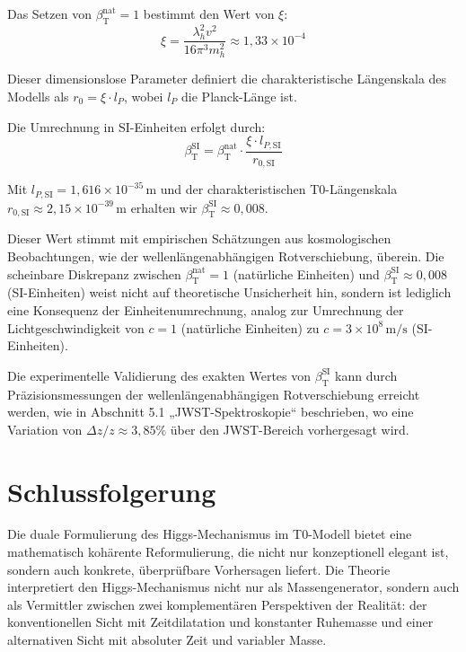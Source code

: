 \documentclass[a4paper,12pt]{article}
\newcommand{\betaT}{\beta_{\text{T}}}
\begin{document}
	Das Setzen von \(\betaT^{\text{nat}} = 1\) bestimmt den Wert von \(\xi\):
	\begin{equation}
		\xi = \frac{\lambda_h^2 v^2}{16\pi^3 m_h^2} \approx 1,33 \times 10^{-4}
	\end{equation}
	
	Dieser dimensionslose Parameter definiert die charakteristische Längenskala des Modells als \(r_0 = \xi \cdot l_P\), wobei \(l_P\) die Planck-Länge ist.
	
	Die Umrechnung in SI-Einheiten erfolgt durch:
	\begin{equation}
		\betaT^{\text{SI}} = \betaT^{\text{nat}} \cdot \frac{\xi \cdot l_{P,\text{SI}}}{r_{0,\text{SI}}}
	\end{equation}
	
	Mit \(l_{P,\text{SI}} = 1,616 \times 10^{-35} \, \text{m}\) und der charakteristischen T0-Längenskala \(r_{0,\text{SI}} \approx 2,15 \times 10^{-39} \, \text{m}\) erhalten wir \(\betaT^{\text{SI}} \approx 0,008\).
	
	Dieser Wert stimmt mit empirischen Schätzungen aus kosmologischen Beobachtungen, wie der wellenlängenabhängigen Rotverschiebung, überein. Die scheinbare Diskrepanz zwischen \(\betaT^{\text{nat}} = 1\) (natürliche Einheiten) und \(\betaT^{\text{SI}} \approx 0,008\) (SI-Einheiten) weist nicht auf theoretische Unsicherheit hin, sondern ist lediglich eine Konsequenz der Einheitenumrechnung, analog zur Umrechnung der Lichtgeschwindigkeit von \(c = 1\) (natürliche Einheiten) zu \(c = 3 \times 10^8 \, \text{m/s}\) (SI-Einheiten).
	
	Die experimentelle Validierung des exakten Wertes von \(\betaT^{\text{SI}}\) kann durch Präzisionsmessungen der wellenlängenabhängigen Rotverschiebung erreicht werden, wie in Abschnitt 5.1 „JWST-Spektroskopie“ beschrieben, wo eine Variation von \(\Delta z / z \approx 3,85\%\) über den JWST-Bereich vorhergesagt wird.
	
	\section{Schlussfolgerung}
	Die duale Formulierung des Higgs-Mechanismus im T0-Modell bietet eine mathematisch kohärente Reformulierung, die nicht nur konzeptionell elegant ist, sondern auch konkrete, überprüfbare Vorhersagen liefert. Die Theorie interpretiert den Higgs-Mechanismus nicht nur als Massengenerator, sondern auch als Vermittler zwischen zwei komplementären Perspektiven der Realität: der konventionellen Sicht mit Zeitdilatation und konstanter Ruhemasse und einer alternativen Sicht mit absoluter Zeit und variabler Masse.
	
\end{document}
